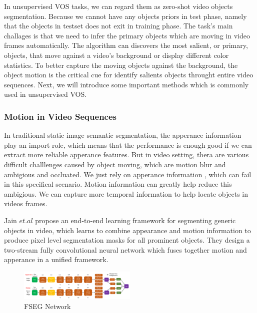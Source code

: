In unsupervised VOS tasks, we can regard them as zero-shot video objects segmentation. Because we cannot have any objects priors
in test phase, namely that the objects in testset does not exit in training phase. The task's main challages is that we need to infer
the primary objects which are moving in video frames automatically. The algorithm can discovers the most salient, or primary, objects,
that move against a video's background or display different color statistics. To better capture the moving objects against the background,
the object motion is the critical cue for identify salients objects throught entire video sequences. Next, we will introduce some important
methods which is commonly used in unsupervised VOS.

\subsubsection{Motion in Video Sequences}
In traditional static image semantic segmentation, the apperance information play an import role, which means that 
the performance is enough good if we can extract more reliable apperance features. But in video setting, thera are various
difficult challlenges caused by object moving, which are motion blur and ambigious and occluated. We just rely on apperance information
, which can  fail in this specifical scenario. Motion information can greatly help reduce this ambigious. We can capture more temporal information
to help locate objects in videos frames.

Jain $et.al$ \cite{Jain2017FusionSeg} propose an end-to-end learning framework for segmenting generic objects in video,
which learns to combine appearance and motion information to produce pixel level segmentation masks for all prominent objects.
They design a two-stream fully convolutional neural network which fuses together motion and apperance in a unified framework.

\begin{figure}
    \begin{center}
    \includegraphics[width=0.5\textwidth]{figure/FSEG_NET.png}
    \end{center}
    \caption{FSEG Network}
    \label{FSEG}
\end{figure}

